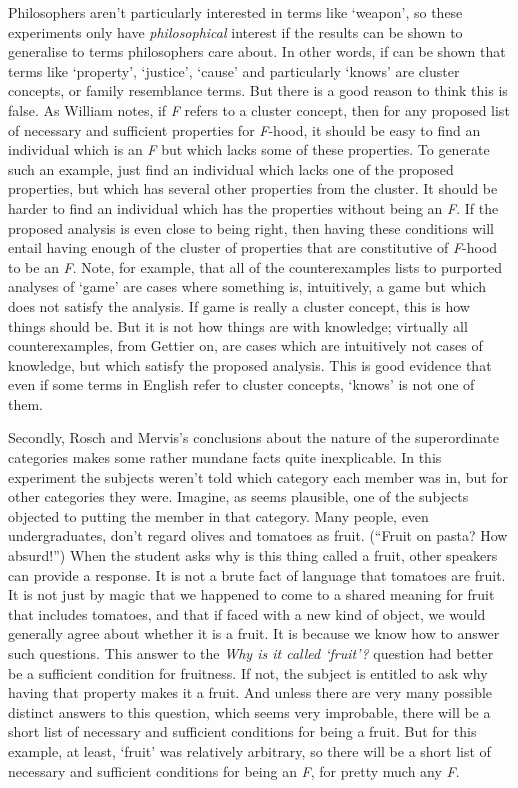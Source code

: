 Philosophers aren't particularly interested in terms like `weapon', so these experiments only have \textit{philosophical }interest if the results can be shown to generalise to terms philosophers care about. In other words, if can be shown that terms like `property', `justice', `cause' and particularly `knows' are cluster concepts, or family resemblance terms. But there is a good reason to think this is false. As William \citet{Ramsey1998} notes, if \textit{F} refers to a cluster concept, then for any proposed list of necessary and sufficient properties for \textit{F}\nobreakdash-hood, it should be easy to find an individual which is an \textit{F} but which lacks some of these properties. To generate such an example, just find an individual which lacks one of the proposed properties, but which has several other properties from the cluster. It should be harder to find an individual which has the properties without being an \textit{F}. If the proposed analysis is even close to being right, then having these conditions will entail having enough of the cluster of properties that are constitutive of \textit{F}\nobreakdash-hood to be an \textit{F}. Note, for example, that all of the counterexamples \citet{Wittgenstein1953} lists to purported analyses of `game' are cases where something is, intuitively, a game but which does not satisfy the analysis. If game is really a cluster concept, this is how things should be. But it is not how things are with knowledge; virtually all counterexamples, from Gettier on, are cases which are intuitively not cases of knowledge, but which satisfy the proposed analysis. This is good evidence that even if some terms in English refer to cluster concepts, `knows' is not one of them.

Secondly, Rosch and Mervis's conclusions about the nature of the superordinate categories makes some rather mundane facts quite inexplicable. In this experiment the subjects weren't told which category each member was in, but for other categories they were. Imagine, as seems plausible, one of the subjects objected to putting the member in that category. Many people, even undergraduates, don't regard olives and tomatoes as fruit. (``Fruit on pasta? How absurd!'') When the student asks why is this thing called a fruit, other speakers can provide a response. It is not a brute fact of language that tomatoes are fruit. It is not just by magic that we happened to come to a shared meaning for fruit that includes tomatoes, and that if faced with a new kind of object, we would generally agree about whether it is a fruit. It is because we know how to answer such questions. This answer to the \textit{Why is it called `fruit'?} question had better be a sufficient condition for fruitness. If not, the subject is entitled to ask why having that property makes it a fruit. And unless there are very many possible distinct answers to this question, which seems very improbable, there will be a short list of necessary and sufficient conditions for being a fruit. But for this example, at least, `fruit' was relatively arbitrary, so there will be a short list of necessary and sufficient conditions for being an \textit{F}, for pretty much any \textit{F}.

